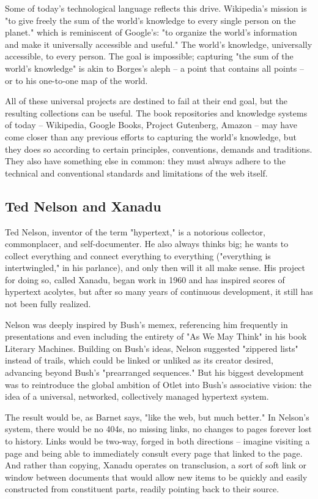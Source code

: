 Some of today's technological language reflects this drive. Wikipedia's mission is "to give freely the sum of the world's knowledge to every single person on the planet."  which is reminiscent of Google's: "to organize the world's information and make it universally accessible and useful."  The world's knowledge, universally accessible, to every person. The goal is impossible; capturing "the sum of the world's knowledge" is akin to Borges's aleph – a point that contains all points – or to his one-to-one map of the world. 

All of these universal projects are destined to fail at their end goal, but the resulting collections can be useful. The book repositories and knowledge systems of today – Wikipedia, Google Books, Project Gutenberg, Amazon – may have come closer than any previous efforts to capturing the world's knowledge, but they does so according to certain principles, conventions, demands and traditions. They also have something else in common: they must always adhere to the technical and conventional standards and limitations of the web itself. 

\subsection{Ted Nelson and Xanadu}

Ted Nelson, inventor of the term "hypertext," is a notorious collector, commonplacer, and self-documenter. He also always thinks big; he wants to collect everything and connect everything to everything ("everything is intertwingled," in his parlance), and only then will it all make sense. His project for doing so, called Xanadu, began work in 1960 and has inspired scores of hypertext acolytes, but after so many years of continuous development, it still has not been fully realized.

Nelson was deeply inspired by Bush's memex, referencing him frequently in presentations and even including the entirety of "As We May Think" in his book Literary Machines. Building on Bush's ideas, Nelson suggested "zippered lists" instead of trails, which could be linked or unliked as its creator desired, advancing beyond Bush's "prearranged sequences."  But his biggest development was to reintroduce the global ambition of Otlet into Bush's associative vision: the idea of a universal, networked, collectively managed hypertext system.

The result would be, as Barnet says, "like the web, but much better."  In Nelson's system, there would be no 404s, no missing links, no changes to pages forever lost to history. Links would be two-way, forged in both directions – imagine visiting a page and being able to immediately consult every page that linked to the page. And rather than copying, Xanadu operates on transclusion, a sort of soft link or window between documents that would allow new items to be quickly and easily constructed from constituent parts, readily pointing back to their source.

